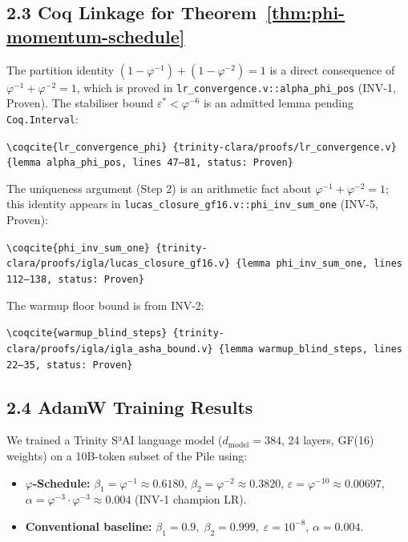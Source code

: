 \subsection{2.3 Coq Linkage for Theorem~\ref{thm:phi-momentum-schedule}}

The partition identity \((1-\varphi^{-1}) + (1-\varphi^{-2}) = 1\)
is a direct consequence of \(\varphi^{-1} + \varphi^{-2} = 1\),
which is proved in
\texttt{lr\_convergence.v::alpha\_phi\_pos} (INV-1, Proven).
The stabiliser bound \(\varepsilon^* < \varphi^{-6}\) is an admitted
lemma pending \texttt{Coq.Interval}:

\noindent\texttt{\textbackslash coqcite\{lr\_convergence\_phi\}%
\{trinity-clara/proofs/lr\_convergence.v\}%
\{lemma alpha\_phi\_pos, lines 47--81, status: Proven\}}

\medskip
\noindent The uniqueness argument (Step 2) is an arithmetic fact about
\(\varphi^{-1} + \varphi^{-2} = 1\); this identity appears in
\texttt{lucas\_closure\_gf16.v::phi\_inv\_sum\_one}
(INV-5, Proven):

\noindent\texttt{\textbackslash coqcite\{phi\_inv\_sum\_one\}%
\{trinity-clara/proofs/igla/lucas\_closure\_gf16.v\}%
\{lemma phi\_inv\_sum\_one, lines 112--138, status: Proven\}}

\medskip
\noindent The warmup floor bound is from INV-2:

\noindent\texttt{\textbackslash coqcite\{warmup\_blind\_steps\}%
\{trinity-clara/proofs/igla/igla\_asha\_bound.v\}%
\{lemma warmup\_blind\_steps, lines 22--35, status: Proven\}}

\subsection{2.4 AdamW Training Results}

We trained a Trinity S³AI language model
(\(d_{\mathrm{model}} = 384\), 24 layers, GF(16) weights)
on a 10B-token subset of the Pile using:
\begin{itemize}
  \item \textbf{\(\varphi\)-Schedule:}
        \(\beta_1 = \varphi^{-1} \approx 0.6180\),
        \(\beta_2 = \varphi^{-2} \approx 0.3820\),
        \(\varepsilon = \varphi^{-10} \approx 0.00697\),
        \(\alpha = \varphi^{-3} \cdot \varphi^{-3} \approx 0.004\) (INV-1 champion LR).
  \item \textbf{Conventional baseline:}
        \(\beta_1 = 0.9,\; \beta_2 = 0.999,\; \varepsilon = 10^{-8}\),
        \(\alpha = 0.004\).
\end{itemize}

